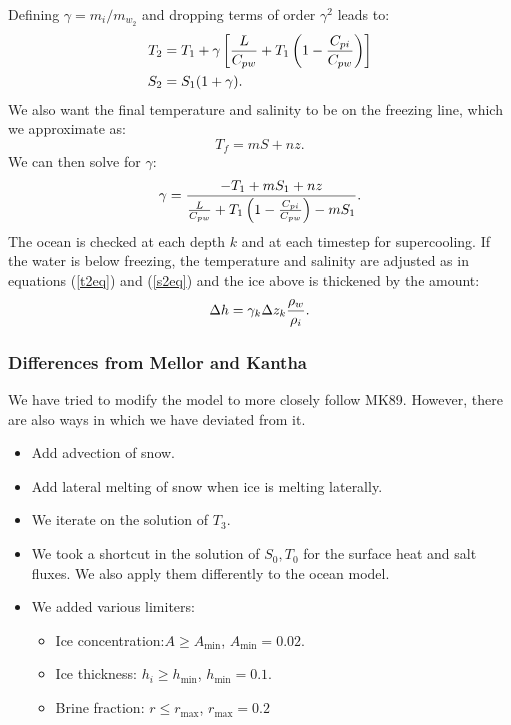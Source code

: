 Defining $\gamma = m_i / m_{w_2}$ and dropping terms of order $\gamma^2$
leads to:
\begin{align}
   T_2 & = T_1 + \gamma \left[ {L \over C_{pw}} + T_1 \left( 1
   - {C_{pi} \over C_{pw}} \right) \right] \label{t2eq} \\
   S_2 & = S_1 (1 + \gamma) \label{s2eq} .
\end{align}
We also want the final temperature and salinity to be on the freezing
line, which we approximate as:
\begin{equation}
   T_f = m S + n z .
\end{equation}
We can then solve for $\gamma$:
\begin{equation}
   \gamma = {-T_1 + mS_1 + nz \over {L \over C_{pw}}+ T_1 \left( 1
   - {C_{pi} \over C_{pw}} \right) - mS_1} .
\end{equation}
The ocean is checked at each depth $k$ and at each timestep for
supercooling.  If the water is below freezing, the temperature and
salinity are adjusted as in equations (\ref{t2eq}) and (\ref{s2eq})
and the ice above is thickened by the amount:
\begin{equation}
   \Delta h = \gamma_k \Delta z_k {\rho_w \over \rho_i} .
\end{equation}

\subsubsection{Differences from Mellor and Kantha}
We have tried to modify the  model to more closely follow
MK89. However, there are also ways in which we have deviated from it.
\begin{itemize}
  \item Add advection of snow.
  \item Add lateral melting of snow when ice is melting laterally.
  \item We iterate on the solution of $T_3$.
  \item We took a shortcut in the solution of $S_0, T_0$ for the
    surface heat and salt fluxes. We also apply them differently to the
    ocean model.
  \item We added various limiters:
    \begin{itemize}
      \item Ice concentration:$A \geq A_{\min}$, $A_{\min} = 0.02$.
      \item Ice thickness: $h_i \geq h_{\min}$, $h_{\min} = 0.1$.
      \item Brine fraction: $r \leq r_{\max}$, $r_{\max} = 0.2$
    \end{itemize}
\end{itemize}
